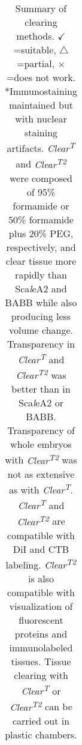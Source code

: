 \begin{landscape}
\begin{table}[hbtp]
\begin{center}
\begin{tabular}{lc|c|c|c|}
\end{tabular}
\scriptsize
\caption[Summary of clearing methods.]{
\scriptsize
Summary of clearing methods.
$\checkmark$=suitable, $\bigtriangleup$=partial, $\times$=does not work.
*Immunostaining maintained but with nuclear staining artifacts.
\emph{Clear\textsuperscript{T}} and \emph{Clear\textsuperscript{T2}} were composed of 95\% formamide or 50\% formamide plus 20\% PEG, respectively, and clear tissue more rapidly than Sca\emph{l}eA2 and BABB while also producing less volume change.
Transparency in \emph{Clear\textsuperscript{T}} and \emph{Clear\textsuperscript{T2}} was better than in Sca\emph{l}eA2 or BABB.
Transparency of whole embryos with \emph{Clear\textsuperscript{T2}} was not as extensive as with \emph{Clear\textsuperscript{T}}.
\emph{Clear\textsuperscript{T}} and \emph{Clear\textsuperscript{T2}} are compatible with DiI and CTB labeling.
\emph{Clear\textsuperscript{T2}} is also compatible with visualization of fluorescent proteins and immunolabeled tissues.
Tissue clearing with \emph{Clear\textsuperscript{T}} or \emph{Clear\textsuperscript{T2}} can be carried out in plastic chambers.}
\label{clearingsupplemental}
\end{center}
\end{table}
\end{landscape}
\normalsize
